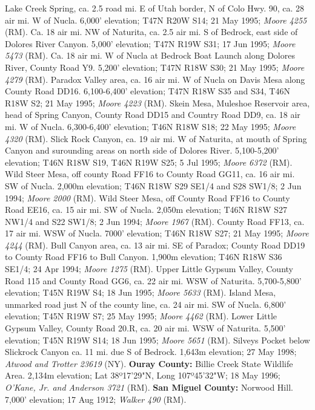 Lake Creek Spring, ca. 2.5 road mi. E of Utah border, N of Colo Hwy. 90, ca.
28 air mi. W of Nucla. 6,000' elevation; T47N R20W S14; 21 May 1995;
\textit{Moore 4255} (RM).
Ca. 18 air mi. NW of Naturita, ca. 2.5 air mi. S of Bedrock, east side of
Dolores River Canyon. 5,000' elevation; T47N R19W S31; 17 Jun 1995;
\textit{Moore 5473} (RM).
Ca. 18 air mi. W of Nucla at Bedrock Boat Launch along Dolores River, County
Road Y9. 5,200' elevation; T47N R18W S30; 21 May 1995; \textit{Moore 4279} (RM).
Paradox Valley area, ca. 16 air mi. W of Nucla on Davis Mesa along County Road
DD16. 6,100-6,400' elevation; T47N R18W S35 and S34, T46N R18W S2; 21 May 1995;
\textit{Moore 4223} (RM).
Skein Mesa, Muleshoe Reservoir area, head of Spring Canyon, County Road DD15 and
Country Road DD9, ca. 18 air mi. W of Nucla. 6,300-6,400' elevation;
T46N R18W S18; 22 May 1995; \textit{Moore 4320} (RM).
Slick Rock Canyon, ca. 19 air mi. W of Naturita, at mouth of Spring Canyon and
surounding areas on north side of Dolores River. 5,100-5,200' elevation;
T46N R18W S19, T46N R19W S25; 5 Jul 1995; \textit{Moore 6372} (RM).
Wild Steer Mesa, off county Road FF16 to County Road GG11, ca. 16 air mi. SW of
Nucla. 2,000m elevation; T46N R18W S29 SE1/4 and S28 SW1/8; 2 Jun 1994;
\textit{Moore 2000} (RM).
Wild Steer Mesa, off County Road FF16 to County Road EE16, ca. 15 air mi. SW of
Nucla. 2,050m elevation; T46N R18W S27 NW1/4 and S22 SW1/8; 2 Jun 1994;
\textit{Moore 1967} (RM).
County Road FF13, ca. 17 air mi. WSW of Nucla. 7000' elevation; T46N R18W S27;
21 May 1995; \textit{Moore 4244} (RM).
Bull Canyon area, ca. 13 air mi. SE of Paradox; County Road DD19 to County Road
FF16 to Bull Canyon. 1,900m elevation; T46N R18W S36 SE1/4; 24 Apr 1994;
\textit{Moore 1275} (RM).
Upper Little Gypsum Valley, County Road 115 and County Road GG6, ca. 22 air mi.
WSW of Naturita. 5,700-5,800' elevation; T45N R19W S4; 18 Jun 1995;
\textit{Moore 5633} (RM).
Island Mesa, unmarked road just N of the county line, ca. 24 air mi. SW of Nucla.
6,800' elevation; T45N R19W S7; 25 May 1995; \textit{Moore 4462} (RM).
Lower Little Gypsum Valley, County Road 20.R, ca. 20 air mi. WSW of Naturita.
5,500' elevation; T45N R19W S14; 18 Jun 1995; \textit{Moore 5651} (RM).
Silveys Pocket below Slickrock Canyon ca. 11 mi. due S of Bedrock.
1,643m elevation; 27 May 1998; \textit{Atwood and Trotter 23619} (NY).
  \textbf{Ouray County:}
Billie Creek State Wildlife Area. 2,134m elevation; Lat 38º17'29"N,
Long 107º45'32"W; 18 May 1996; \textit{O'Kane, Jr. and Anderson 3721} (RM).
  \textbf{San Miguel County:}
Norwood Hill. 7,000' elevation; 17 Aug 1912; \textit{Walker 490} (RM).
